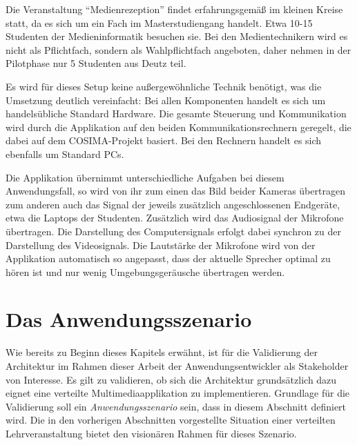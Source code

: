   Die Veranstaltung "`Medienrezeption"' findet erfahrungsgemäß im kleinen Kreise statt, da es sich um ein Fach im Masterstudiengang handelt. Etwa 10-15 Studenten der Medieninformatik besuchen sie. Bei den Medientechnikern wird es nicht als Pflichtfach, sondern als Wahlpflichtfach angeboten, daher nehmen in der Pilotphase nur 5 Studenten aus Deutz teil.

  Es wird für dieses Setup keine außergewöhnliche Technik benötigt, was die Umsetzung deutlich vereinfacht: Bei allen Komponenten handelt es sich um handelsübliche Standard Hardware. Die gesamte Steuerung und Kommunikation wird durch die Applikation auf den beiden Kommunikationsrechnern geregelt, die dabei auf dem COSIMA-Projekt basiert. Bei den Rechnern handelt es sich ebenfalls um Standard PCs.

  Die Applikation übernimmt unterschiedliche Aufgaben bei diesem Anwendungsfall, so wird von ihr zum einen das Bild beider Kameras übertragen zum anderen auch das Signal der jeweils zusätzlich angeschlossenen Endgeräte, etwa die Laptops der Studenten. Zusätzlich wird das Audiosignal der Mikrofone übertragen. Die Darstellung des Computersignals erfolgt dabei synchron zu der Darstellung des Videosignals. Die Lautstärke der Mikrofone wird von der Applikation automatisch so angepasst, dass der aktuelle Sprecher optimal zu hören ist und nur wenig Umgebungsgeräusche übertragen werden.





\section{Das Anwendungsszenario} %
\label{sub:das_anwendungsszenario}

  Wie bereits zu Beginn dieses Kapitels erwähnt, ist für die Validierung der Architektur im Rahmen dieser Arbeit der Anwendungsentwickler als Stakeholder von Interesse. Es gilt zu validieren, ob sich die Architektur grundsätzlich dazu eignet eine verteilte Multimediaapplikation zu implementieren. Grundlage für die Validierung soll ein \emph{Anwendungsszenario} sein, dass in diesem Abschnitt definiert wird. Die in den vorherigen Abschnitten vorgestellte Situation einer verteilten Lehrveranstaltung bietet den visionären Rahmen für dieses Szenario.
  
